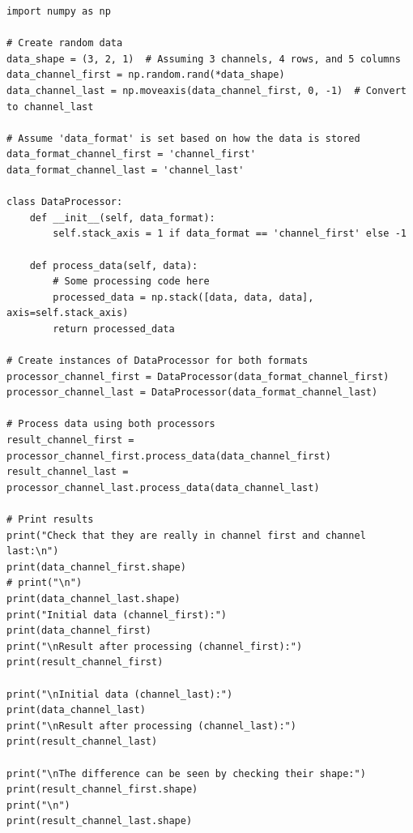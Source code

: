 \documentclass[12pt]{report}
\numberwithin{equation}{section}
\begin{document}
\begin{lstlisting}
import numpy as np

# Create random data
data_shape = (3, 2, 1)  # Assuming 3 channels, 4 rows, and 5 columns
data_channel_first = np.random.rand(*data_shape)
data_channel_last = np.moveaxis(data_channel_first, 0, -1)  # Convert to channel_last

# Assume 'data_format' is set based on how the data is stored
data_format_channel_first = 'channel_first'
data_format_channel_last = 'channel_last'

class DataProcessor:
    def __init__(self, data_format):
        self.stack_axis = 1 if data_format == 'channel_first' else -1

    def process_data(self, data):
        # Some processing code here
        processed_data = np.stack([data, data, data], axis=self.stack_axis)
        return processed_data

# Create instances of DataProcessor for both formats
processor_channel_first = DataProcessor(data_format_channel_first)
processor_channel_last = DataProcessor(data_format_channel_last)

# Process data using both processors
result_channel_first = processor_channel_first.process_data(data_channel_first)
result_channel_last = processor_channel_last.process_data(data_channel_last)

# Print results
print("Check that they are really in channel first and channel last:\n")
print(data_channel_first.shape)
# print("\n")
print(data_channel_last.shape)
print("Initial data (channel_first):")
print(data_channel_first)
print("\nResult after processing (channel_first):")
print(result_channel_first)

print("\nInitial data (channel_last):")
print(data_channel_last)
print("\nResult after processing (channel_last):")
print(result_channel_last)

print("\nThe difference can be seen by checking their shape:")
print(result_channel_first.shape)
print("\n")
print(result_channel_last.shape)
\end{lstlisting}
\end{document}
